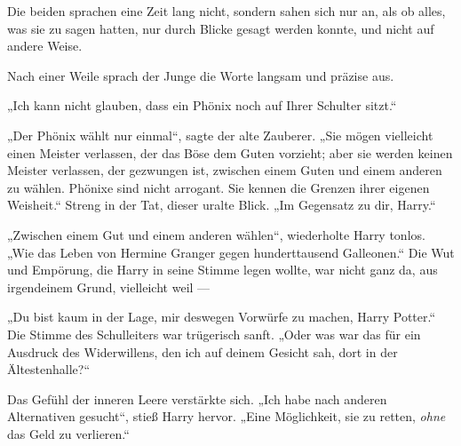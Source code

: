Die beiden sprachen eine Zeit lang nicht, sondern sahen sich nur an, als ob alles, was sie zu sagen hatten, nur durch Blicke gesagt werden konnte, und nicht auf andere Weise.

Nach einer Weile sprach der Junge die Worte langsam und präzise aus.

„Ich kann nicht glauben, dass ein Phönix noch auf Ihrer Schulter sitzt.“

„Der Phönix wählt nur einmal“, sagte der alte Zauberer.
„Sie mögen vielleicht einen Meister verlassen, der das Böse dem Guten vorzieht; aber sie werden keinen Meister verlassen, der gezwungen ist, zwischen einem Guten und einem anderen zu wählen. Phönixe sind nicht arrogant. Sie kennen die Grenzen ihrer eigenen Weisheit.“
Streng in der Tat, dieser uralte Blick.
„Im Gegensatz zu dir, Harry.“

„Zwischen einem Gut und einem anderen wählen“, wiederholte Harry tonlos.
„Wie das Leben von Hermine Granger gegen hunderttausend Galleonen.“
Die Wut und Empörung, die Harry in seine Stimme legen wollte, war nicht ganz da, aus irgendeinem Grund, vielleicht weil —

„Du bist kaum in der Lage, mir deswegen Vorwürfe zu machen, Harry Potter.“
Die Stimme des Schulleiters war trügerisch sanft.
„Oder was war das für ein Ausdruck des Widerwillens, den ich auf deinem Gesicht sah, dort in der Ältestenhalle?“

Das Gefühl der inneren Leere verstärkte sich.
„Ich habe nach anderen Alternativen gesucht“, stieß Harry hervor.
„Eine Möglichkeit, sie zu retten, \emph{ohne} das Geld zu verlieren.“

